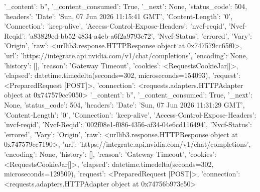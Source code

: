 
{'_content': b'', '_content_consumed': True, '_next': None, 'status_code': 504, 'headers': {'Date': 'Sun, 07 Jun 2026 11:15:41 GMT', 'Content-Length': '0', 'Connection': 'keep-alive', 'Access-Control-Expose-Headers': 'nvcf-reqid', 'Nvcf-Reqid': 'a83829ed-bb52-4834-a4cb-a6f2a9793c72', 'Nvcf-Status': 'errored', 'Vary': 'Origin'}, 'raw': <urllib3.response.HTTPResponse object at 0x747579cc65f0>, 'url': 'https://integrate.api.nvidia.com/v1/chat/completions', 'encoding': None, 'history': [], 'reason': 'Gateway Timeout', 'cookies': <RequestsCookieJar[]>, 'elapsed': datetime.timedelta(seconds=302, microseconds=154093), 'request': <PreparedRequest [POST]>, 'connection': <requests.adapters.HTTPAdapter object at 0x747579cc9050>}
{'_content': b'', '_content_consumed': True, '_next': None, 'status_code': 504, 'headers': {'Date': 'Sun, 07 Jun 2026 11:31:29 GMT', 'Content-Length': '0', 'Connection': 'keep-alive', 'Access-Control-Expose-Headers': 'nvcf-reqid', 'Nvcf-Reqid': '002f08e1-f086-4356-af34-04e6cd116494', 'Nvcf-Status': 'errored', 'Vary': 'Origin'}, 'raw': <urllib3.response.HTTPResponse object at 0x747579cc7190>, 'url': 'https://integrate.api.nvidia.com/v1/chat/completions', 'encoding': None, 'history': [], 'reason': 'Gateway Timeout', 'cookies': <RequestsCookieJar[]>, 'elapsed': datetime.timedelta(seconds=302, microseconds=129509), 'request': <PreparedRequest [POST]>, 'connection': <requests.adapters.HTTPAdapter object at 0x74756b973e50>}
